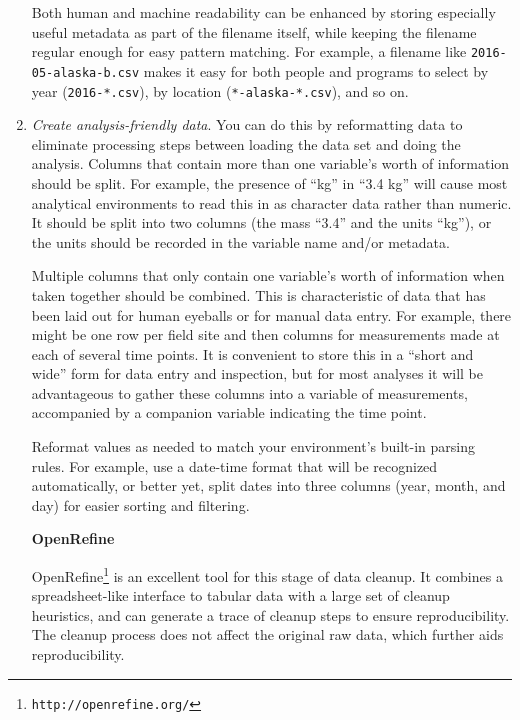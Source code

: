\documentclass[10pt]{article}
\newcommand{\recommend}[1]{\textit{#1}}
\newcommand{\withurl}[2]{{#1}\footnote{\texttt{#2}}}
\begin{document}
\begin{enumerate}
  Both human and machine readability can be enhanced by storing
  especially useful metadata as part of the filename itself, while
  keeping the filename regular enough for easy pattern matching. For
  example, a filename like \texttt{2016-05-alaska-b.csv} makes it easy
  for both people and programs to select by year
  (\texttt{2016-*.csv}), by location (\texttt{*-alaska-*.csv}), and so
  on.

\item
  \recommend{Create analysis-friendly data}.  You can do this by
  reformatting data to eliminate processing steps between loading the
  data set and doing the analysis.  Columns that contain more than one
  variable's worth of information should be split. For example, the
  presence of ``kg'' in ``3.4 kg'' will cause most analytical
  environments to read this in as character data rather than
  numeric. It should be split into two columns (the mass ``3.4'' and
  the units ``kg''), or the units should be recorded in the variable
  name and/or metadata.

  Multiple columns that only contain one variable's worth of
  information when taken together should be combined. This is
  characteristic of data that has been laid out for human eyeballs or
  for manual data entry.  For example, there might be one row per
  field site and then columns for measurements made at each of several
  time points. It is convenient to store this in a ``short and wide''
  form for data entry and inspection, but for most analyses it will be
  advantageous to gather these columns into a variable of
  measurements, accompanied by a companion variable indicating the
  time point.

  Reformat values as needed to match your environment's built-in
  parsing rules. For example, use a date-time format that will be
  recognized automatically, or better yet, split dates into three
  columns (year, month, and day) for easier sorting and filtering.

  \begin{framed}
    \noindent \textbf{OpenRefine}

    \withurl{OpenRefine}{http://openrefine.org/} is an excellent tool
    for this stage of data cleanup. It combines a spreadsheet-like
    interface to tabular data with a large set of cleanup heuristics,
    and can generate a trace of cleanup steps to ensure
    reproducibility.  The cleanup process does not affect the original
    raw data, which further aids reproducibility.
  \end{framed}


\end{enumerate}
\end{document}
